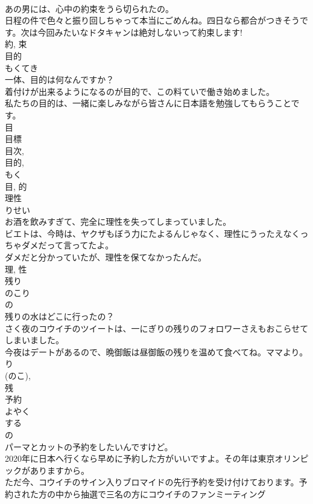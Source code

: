 \documentclass[8pt]{extreport}
\begin{document}
\begin{CJK}{UTF8}{min}
\\	あの男には、心中の約束をうら切られたの。	
\\	日程の件で色々と振り回しちゃって本当にごめんね。四日なら都合がつきそうです。次は今回みたいなドタキャンは絶対しないって約束します!	
\\	約, 束	
\\	目的	
\\	もくてき	
\\	一体、目的は何なんですか？	
\\	着付けが出来るようになるのが目的で、この料ていで働き始めました。	
\\	私たちの目的は、一緒に楽しみながら皆さんに日本語を勉強してもらうことです。	
\\	目 
\\	目標 
\\	目次, 
\\	目的, 
\\	もく 
\\	目, 的	
\\	理性	
\\	りせい	
\\	お酒を飲みすぎて、完全に理性を失ってしまっていました。	
\\	ビエトは、今時は、ヤクザもぼう力にたよるんじゃなく、理性にうったえなくっちゃダメだって言ってたよ。	
\\	ダメだと分かっていたが、理性を保てなかったんだ。	
\\	理, 性	
\\	残り	
\\	のこり	
\\	の 
\\	残りの水はどこに行ったの？	
\\	さく夜のコウイチのツイートは、一にぎりの残りのフォロワーさえもおこらせてしまいました。	
\\	今夜はデートがあるので、晩御飯は昼御飯の残りを温めて食べてね。ママより。	
\\	り 
\\	(のこ), 
\\	残	
\\	予約	
\\	よやく	
\\	する 
\\	の 
\\	パーマとカットの予約をしたいんですけど。	
\\	2020年に日本へ行くなら早めに予約した方がいいですよ。その年は東京オリンピックがありますから。	
\\	ただ今、コウイチのサイン入りブロマイドの先行予約を受け付けております。予約された方の中から抽選で三名の方にコウイチのファンミーティング

\end{CJK}
\end{document}
